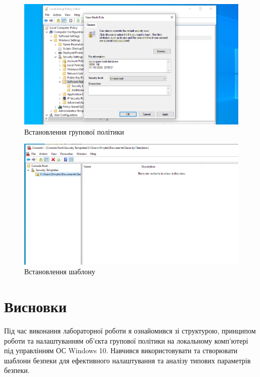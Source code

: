 \documentclass[oneside,14pt]{extarticle}
\begin{document}
\begin{normalsize}
		\begin{figure}[H]
		\centering
		\includegraphics[width=\columnwidth]{9}
		\caption{Встановлення групової політики}
	\end{figure}
	\begin{figure}[H]
		\centering
		\includegraphics[width=\columnwidth]{10}
		\caption{Встановлення шаблону}
	\end{figure}
	
	\section*{Висновки}
	Під час виконання лабораторної роботи я ознайомився зі структурою, принципом роботи та
	налаштуванням об’єкта групової політики на локальному комп’ютері під
	управлінням ОС Windows 10. Навчився використовувати та створювати
	шаблони безпеки для ефективного налаштування та аналізу типових параметрів
	безпеки.
		    
\end{normalsize}
\end{document}

